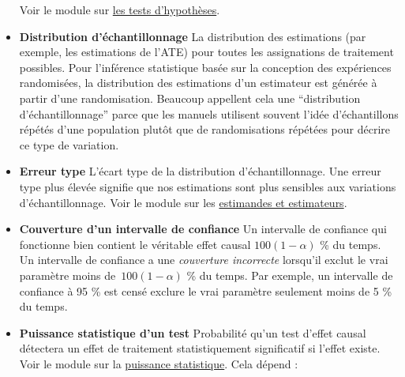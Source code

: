 \documentclass[
  12pt,
]{book}
\begin{document}
\begin{itemize}
  Voir le module sur \href{hypothesis-testing.html}{les tests d'hypothèses}.
\item
  \textbf{Distribution d'échantillonnage} La distribution des estimations (par exemple, les estimations de l'ATE) pour toutes les assignations de traitement possibles.
  Pour l'inférence statistique basée sur la conception des expériences randomisées, la distribution des estimations d'un estimateur est générée à partir d'une randomisation.
  Beaucoup appellent cela une ``distribution d'échantillonnage'' parce que les manuels utilisent souvent l'idée d'échantillons répétés d'une population plutôt que de randomisations répétées pour décrire ce type de variation.
\item
  \textbf{Erreur type} L'écart type de la distribution d'échantillonnage. Une erreur type plus élevée signifie que nos estimations sont plus sensibles aux variations d'échantillonnage.
  Voir le module sur les \href{estimands-and-estimateurs.html}{estimandes et estimateurs}.
\item
  \textbf{Couverture d'un intervalle de confiance} Un intervalle de confiance qui fonctionne bien contient le véritable effet causal \(100 ( 1 - \alpha)\) \% du temps.
  Un intervalle de confiance a une \emph{couverture incorrecte} lorsqu'il exclut le vrai paramètre moins de~\(100 (1 - \alpha)\) \% du temps.
  Par exemple, un intervalle de confiance à 95 \% est censé exclure le vrai paramètre seulement moins de 5 \% du temps.
\item
  \textbf{Puissance statistique d'un test} Probabilité qu'un test d'effet causal détectera un effet de traitement statistiquement significatif si l'effet existe.
  Voir le module sur la \href{statistical-power-and-design-diagnosands.html}{puissance statistique}.
  Cela dépend :


\end{itemize}
\end{document}
